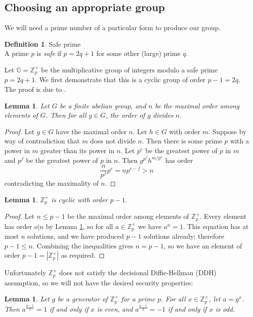 \documentclass[11pt,twoside,a4paper]{article}
\newtheorem{lemma}[theorem]{Lemma}
\theoremstyle{definition}
\newtheorem{definition}{Definition}[section]
\begin{document}
\subsection{Choosing an appropriate group}
We will need a prime number of a particular form to produce our group.
\begin{definition}{Safe prime}\\
    A prime \(p\) is \textit{safe} if \(p=2q+1\) for some other (large) prime \(q\).
\end{definition}
Let \(\mathbb{G}=\mathbb{Z}^\times_p\) be the multiplicative group of integers modulo a safe prime \(p=2q+1\). We first demonstrate that this is a cyclic group of order \(p-1=2q\). The proof is due to \cite{cyclicity}.
\begin{lemma}\label{lem-order-divides}
    Let \(G\) be a finite abelian group, and \(n\) be the maximal order among elements of \(G\). Then for all \(g\in G\), the order of \(g\) divides \(n\).
\end{lemma}
\begin{proof}
    Let \(g\in G\) have the maximal order \(n\). Let \(h\in G\) with order \(m\). Suppose by way of contradiction that \(m\) does not divide \(n\). Then there is some prime \(p\) with a power in \(m\) greater than its power in \(n\). Let \(p^e\) be the greatest power of \(p\) in \(m\) and \(p^f\) be the greatest power of \(p\) in \(n\). Then \(g^{p^f}h^{m/p^e}\) has order
    \[\frac{n}{p^f}p^e=np^{e-f}>n\]
    contradicting the maximality of \(n\).
\end{proof}
\begin{lemma}
    \(\mathbb{Z}^\times_p\) is cyclic with order \(p-1\).
\end{lemma}
\begin{proof}
    Let \(n\leq p-1\) be the maximal order among elements of \(\mathbb{Z}^\times_p\). Every element has order \(o\vert n\) by Lemma \ref{lem-order-divides}, so for all \(a\in\mathbb{Z}^\times_p\) we have \(a^n=1\). This equation has at most \(n\) solutions, and we have produced \(p-1\) solutions already; therefore \(p-1\leq n\).
    Combining the inequalities gives \(n=p-1\), so we have an element of order \(p-1=|\mathbb{Z}^\times_p|\) as required.
\end{proof}
Unfortunately \(\mathbb{Z}^\times_p\) does not satisfy the decisional Diffie-Hellman (DDH) assumption, so we will not have the desired security properties:
\begin{lemma}\label{lem-parity}
    Let \(g\) be a generator of \(\mathbb{Z}^\times_p\) for a prime \(p\). For all \(x\in\mathbb{Z}^\times_p\), let \(a=g^x\). Then \(a^{\frac{p-1}{2}} = 1\) if and only if \(x\) is even, and \(a^{\frac{p-1}{2}} = -1\) if and only if \(x\) is odd.
\end{lemma}
\end{document}
